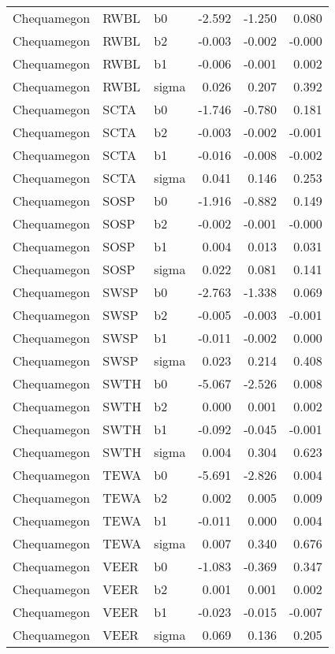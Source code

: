 \begin{table}[ht]
\begin{center}
\begin{tabular}{lllrrr}
  Chequamegon & RWBL & b0 & -2.592 & -1.250 & 0.080 \\ 
  Chequamegon & RWBL & b2 & -0.003 & -0.002 & -0.000 \\ 
  Chequamegon & RWBL & b1 & -0.006 & -0.001 & 0.002 \\ 
  Chequamegon & RWBL & sigma & 0.026 & 0.207 & 0.392 \\ 
  Chequamegon & SCTA & b0 & -1.746 & -0.780 & 0.181 \\ 
  Chequamegon & SCTA & b2 & -0.003 & -0.002 & -0.001 \\ 
  Chequamegon & SCTA & b1 & -0.016 & -0.008 & -0.002 \\ 
  Chequamegon & SCTA & sigma & 0.041 & 0.146 & 0.253 \\ 
  Chequamegon & SOSP & b0 & -1.916 & -0.882 & 0.149 \\ 
  Chequamegon & SOSP & b2 & -0.002 & -0.001 & -0.000 \\ 
  Chequamegon & SOSP & b1 & 0.004 & 0.013 & 0.031 \\ 
  Chequamegon & SOSP & sigma & 0.022 & 0.081 & 0.141 \\ 
  Chequamegon & SWSP & b0 & -2.763 & -1.338 & 0.069 \\ 
  Chequamegon & SWSP & b2 & -0.005 & -0.003 & -0.001 \\ 
  Chequamegon & SWSP & b1 & -0.011 & -0.002 & 0.000 \\ 
  Chequamegon & SWSP & sigma & 0.023 & 0.214 & 0.408 \\ 
  Chequamegon & SWTH & b0 & -5.067 & -2.526 & 0.008 \\ 
  Chequamegon & SWTH & b2 & 0.000 & 0.001 & 0.002 \\ 
  Chequamegon & SWTH & b1 & -0.092 & -0.045 & -0.001 \\ 
  Chequamegon & SWTH & sigma & 0.004 & 0.304 & 0.623 \\ 
  Chequamegon & TEWA & b0 & -5.691 & -2.826 & 0.004 \\ 
  Chequamegon & TEWA & b2 & 0.002 & 0.005 & 0.009 \\ 
  Chequamegon & TEWA & b1 & -0.011 & 0.000 & 0.004 \\ 
  Chequamegon & TEWA & sigma & 0.007 & 0.340 & 0.676 \\ 
  Chequamegon & VEER & b0 & -1.083 & -0.369 & 0.347 \\ 
  Chequamegon & VEER & b2 & 0.001 & 0.001 & 0.002 \\ 
  Chequamegon & VEER & b1 & -0.023 & -0.015 & -0.007 \\ 
  Chequamegon & VEER & sigma & 0.069 & 0.136 & 0.205 \\ 

\end{tabular}
\end{center}
\end{table}
